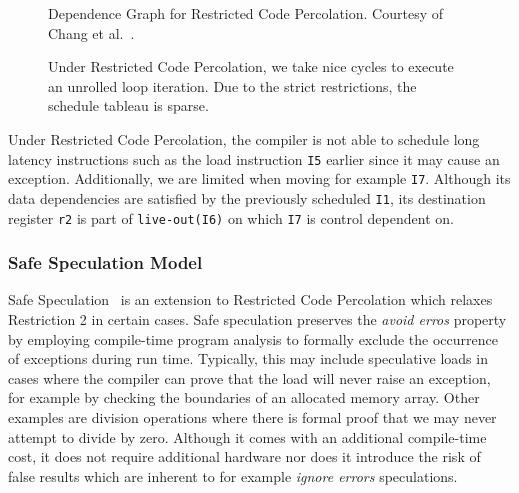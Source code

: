 \begin{center}
    \begin{minipage}{.52\textwidth}
        \begin{figure}[H]
            \centering
            
            \caption[Dependence Graph for Restricted Code Percolation]{Dependence Graph for Restricted Code Percolation. Courtesy of Chang et al.~\cite{chang95}.}
            \label{fig:restric_cfg}
\end{figure}
    \end{minipage}\hfill
    \begin{minipage}{.46\textwidth}
    \begin{figure}[H]
            \centering
            \resizebox{1\textwidth}{!}{
            
        }
        \caption[Schedule for Restricted Code Percolation]{Under Restricted Code Percolation, we take nice cycles to execute an unrolled loop iteration. Due to the strict restrictions, the schedule tableau is sparse.}
        \label{fig:restricted_motion}
\end{figure}
    \end{minipage}
\end{center} 
Under Restricted Code Percolation, the compiler is not able to schedule long latency instructions such as the load instruction \texttt{I5} earlier since it may cause an exception. Additionally, we are limited when moving for example \texttt{I7}. Although its data dependencies are satisfied by the previously scheduled \texttt{I1}, its destination register \texttt{r2} is part of \texttt{live-out(I6)} on which \texttt{I7} is control dependent on. 

\subsubsection{Safe Speculation Model}
Safe Speculation~\cite{bringmannMH95} is an extension to Restricted Code Percolation which relaxes Restriction 2 in certain cases. Safe speculation preserves the \textit{avoid erros} property by employing compile-time program analysis to formally exclude the occurrence of exceptions during run time. Typically, this may include speculative loads in cases where the compiler can prove that the load will never raise an exception, for example by checking the boundaries of an allocated memory array. Other examples are division operations where there is formal proof that we may never attempt to divide by zero. Although it comes with an additional compile-time cost, it does not require additional hardware nor does it introduce the risk of false results which are inherent to for example \textit{ignore errors} speculations.  

